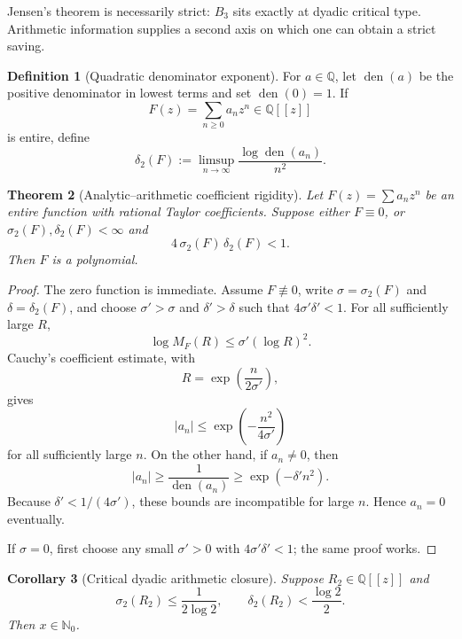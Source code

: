 \documentclass[11pt]{article}
\newtheorem{theorem}{Theorem}[section]
\newtheorem{corollary}[theorem]{Corollary}
\theoremstyle{definition}
\newtheorem{definition}[theorem]{Definition}
\newcommand{\Q}{\mathbb Q}
\newcommand{\Nzero}{\mathbb N_0}
\newcommand{\den}{\operatorname{den}}
\begin{document}
Jensen's theorem is necessarily strict: \(B_3\) sits exactly at dyadic critical type.  Arithmetic information supplies a second axis on which one can obtain a strict saving.

\begin{definition}[Quadratic denominator exponent]\label{def:den-type}
For \(a\in\Q\), let \(\den(a)\) be the positive denominator in lowest terms and set \(\den(0)=1\).  If
\[
  F(z)=\sum_{n\ge0}a_nz^n\in\Q[[z]]
\]
is entire, define
\[
  \delta_2(F):=\limsup_{n\to\infty}
  \frac{\log\den(a_n)}{n^2}.
\]
\end{definition}

\begin{theorem}[Analytic--arithmetic coefficient rigidity]\label{thm:arith-rigidity}
Let \(F(z)=\sum a_nz^n\) be an entire function with rational Taylor coefficients.  Suppose either \(F\equiv0\), or \(\sigma_2(F),\delta_2(F)<\infty\) and
\begin{equation}\label{eq:uncertainty-strict}
  4\,\sigma_2(F)\,\delta_2(F)<1.
\end{equation}
Then \(F\) is a polynomial.
\end{theorem}

\begin{proof}
The zero function is immediate.  Assume \(F\not\equiv0\), write \(\sigma=\sigma_2(F)\) and \(\delta=\delta_2(F)\), and choose \(\sigma'>\sigma\) and \(\delta'>\delta\) such that \(4\sigma'\delta'<1\).  For all sufficiently large \(R\),
\[
  \log M_F(R)\le \sigma'(\log R)^2.
\]
Cauchy's coefficient estimate, with
\[
  R=\exp\left(\frac{n}{2\sigma'}\right),
\]
gives
\begin{equation}\label{eq:cauchy-gaussian}
  |a_n|\le
  \exp\left(-\frac{n^2}{4\sigma'}\right)
\end{equation}
for all sufficiently large \(n\).  On the other hand, if \(a_n\ne0\), then
\[
  |a_n|\ge\frac1{\den(a_n)}
  \ge \exp(-\delta'n^2).
\]
Because \(\delta'<1/(4\sigma')\), these bounds are incompatible for large \(n\).  Hence \(a_n=0\) eventually.

If \(\sigma=0\), first choose any small \(\sigma'>0\) with \(4\sigma'\delta'<1\); the same proof works.
\end{proof}

\begin{corollary}[Critical dyadic arithmetic closure]\label{cor:critical-arith-close}
Suppose \(R_2\in\Q[[z]]\) and
\begin{equation}\label{eq:critical-arith-assumptions}
  \sigma_2(R_2)\le\frac1{2\log2},
  \qquad
  \delta_2(R_2)<\frac{\log2}{2}.
\end{equation}
Then \(x\in\Nzero\).
\end{corollary}
\end{document}
